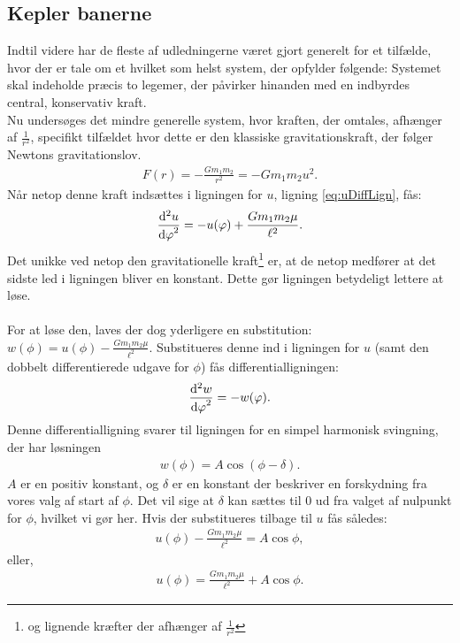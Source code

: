 \subsection{Kepler banerne}
Indtil videre har de fleste af udledningerne været gjort generelt for et tilfælde, hvor der er tale om et hvilket som helst system, der opfylder følgende: Systemet skal indeholde præcis to legemer, der påvirker hinanden med en indbyrdes central, konservativ kraft. \\
%
Nu undersøges det mindre generelle system, hvor kraften, der omtales, afhænger af $\frac{1}{r^2}$, specifikt tilfældet hvor dette er den klassiske gravitationskraft, der følger Newtons gravitationslov.
%
\begin{align}
	F(r) = - \frac{G m_1 m_2}{r^2} = - G m_1 m_2 u^2.
\end{align} 
Når netop denne kraft indsættes i ligningen for $u$, ligning \eqref{eq:uDiffLign}, fås:
%
\begin{align}
	\dif[2]{\phi}{u} = -u(\phi) + \frac{Gm_1m_2 \mu }{\ell ^2}.
\end{align}
Det unikke ved netop den gravitationelle kraft\footnote{og lignende kræfter der afhænger af $\frac{1}{r^2}$} er, at de netop medfører at det sidste led i ligningen bliver en konstant. Dette gør ligningen betydeligt lettere at løse. \\ \\
%
%
For at løse den, laves der dog yderligere en substitution: $w(\phi) = u(\phi) - \frac{Gm_1m_2 \mu}{\ell ^2}$. Substitueres denne ind i ligningen for $u$ (samt den dobbelt differentierede udgave for $\phi$) fås differentialligningen:
\begin{align}
	\dif[2]{\phi}{w} = - w(\phi).
\end{align}
Denne differentialligning svarer til ligningen for en simpel harmonisk svingning, der har løsningen
\begin{align}
	w(\phi) = A\cos (\phi - \delta).
\end{align}
$A$ er en positiv konstant, og $\delta$ er en konstant der beskriver en forskydning fra vores valg af start af $\phi$. Det vil sige at $\delta$ kan sættes til 0 ud fra valget af nulpunkt for $\phi$, hvilket vi gør her. Hvis der substitueres tilbage til $u$ fås således:
\begin{align}
	u(\phi) - \frac{G m_1 m_2 \mu }{\ell ^2} = A \cos \phi,
\end{align}
eller,
\begin{align}
	u(\phi) = \frac{G m_1 m_2 \mu}{\ell ^2} + A \cos \phi.
\end{align}
